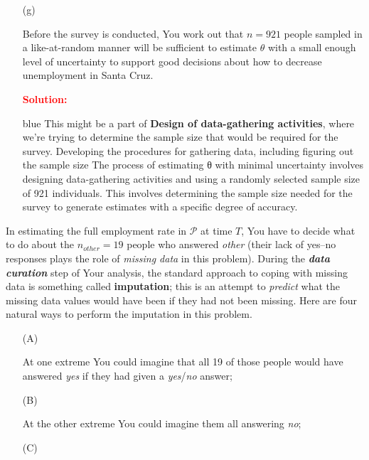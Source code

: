 \documentclass[12pt]{article}
\renewcommand{\b}[1]{\textbf{#1}}
\begin{document}
\begin{itemize}
\begin{itemize}
\item[(g)] 

Before the survey is conducted, You work out that $n = 921$ people sampled in a like-at-random manner will be sufficient to estimate $\theta$ with a small enough level of uncertainty to support good decisions about how to decrease unemployment in Santa Cruz.

\textbf{\textcolor{red}{Solution:}}
\begin{Solution3}{blue}
This might be a part of \textbf{Design of data-gathering activities}, where we’re trying to determine the sample size that would be required for the survey. Developing the procedures for gathering data, including figuring out the sample size The process of estimating θ with minimal uncertainty involves designing data-gathering activities and using a randomly selected sample size of 921 individuals. This involves determining the sample size needed for the survey to generate estimates with a specific degree of accuracy.
\end{Solution3}

\vspace*{2.4in}

\end{itemize}

In estimating the full employment rate in $\mathcal{ P }$ at time $T$, You have to decide what to do about the $n_{ other } = 19$ people who answered \textit{other} (their lack of yes--no responses plays the role of \textit{missing data} in this problem). During the \textbf{\textit{data curation}} step of Your analysis, the standard approach to coping with missing data is something called \b{imputation}; this is an attempt to \textit{predict} what the missing data values would have been if they had not been missing. Here are four natural ways to perform the imputation in this problem.

\begin{itemize}

\item[(A)]

At one extreme You could imagine that all 19 of those people would have answered \textit{yes} if they had given a \textit{yes}/\textit{no} answer;

\item[(B)]

At the other extreme You could imagine them all answering \textit{no};

\item[(C)]


\end{itemize}
\end{itemize}
\end{document}
